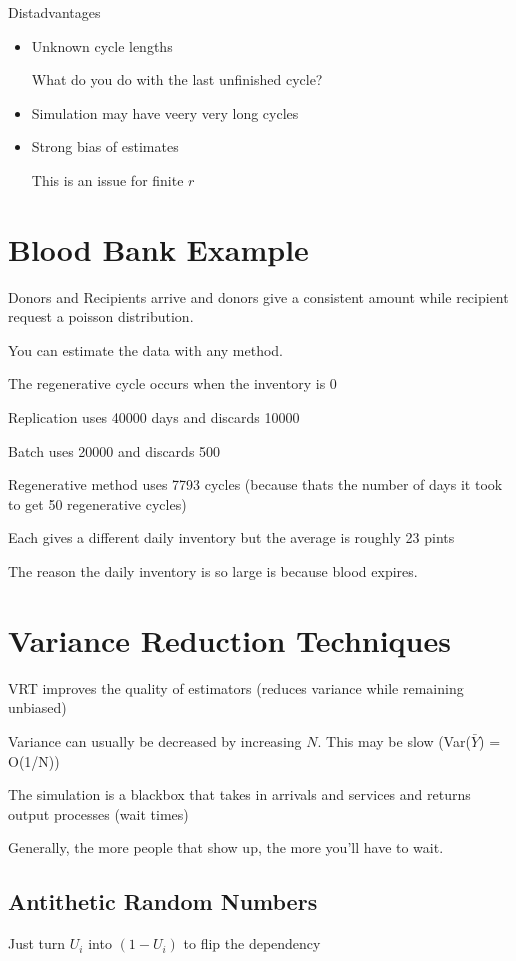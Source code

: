 \documentclass[fleqn]{report}
\begin{document}
Distadvantages 
\begin{itemize}
    \item 
    Unknown cycle lengths 

    What do you do with the last unfinished cycle?
    \item 
    Simulation may have veery very long cycles 
    \item 
    Strong bias of estimates 

    This is an issue for finite $r$ 
\end{itemize}

\section{Blood Bank Example}
Donors and Recipients arrive and donors give a consistent amount 
while recipient request a poisson distribution. 

You can estimate the data with any method. 

The regenerative cycle occurs when the inventory is 0 

Replication uses 40000 days and discards 10000

Batch uses 20000 and discards 500 

Regenerative method uses 7793 cycles (because thats the number 
of days it took to get 50 regenerative cycles)

Each gives a different daily inventory but the average is roughly 23 pints 

The reason the daily inventory is so large is because blood expires. 

\section{Variance Reduction Techniques}
VRT improves the quality of estimators 
(reduces variance while remaining unbiased)

Variance can usually be decreased by increasing $N$. 
This may be slow (Var($\bar Y$) = O(1/N))

The simulation is a blackbox that takes in arrivals and services and returns 
output processes (wait times)

Generally, the more people that show up, the more you'll have to wait. 

\subsection{Antithetic Random Numbers}
Just turn $U_i$ into $(1 - U_i)$ to flip the dependency 
\end{document}
